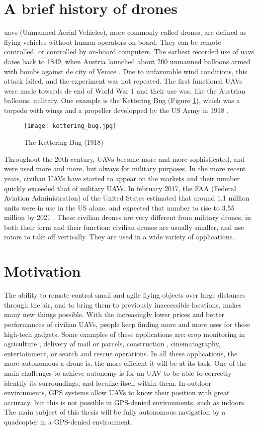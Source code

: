 \section{A brief history of drones}
\Glspl{uav} (Unmanned Aerial Vehicles), more commonly called drones, are defined as flying vehicles without human operators on board. They can be remote-controlled, or controlled by on-board computers. The earliest recorded use of \glspl{uav} dates back to 1849, when Austria launched about 200 unmanned balloons armed with bombs against de city of Venice \cite{anthology}. Due to unfavorable wind conditions, this attack failed, and the experiment was not repeated. The first functional UAVs were made towards de end of World War 1 and their use was, like the Austrian balloons, military. One example is the Kettering Bug (Figure \ref{fig:ketteringbug}), which was a torpedo with wings and a propeller developped by the US Army in 1918 \cite{dronesww1}.
\begin{figure}[H]
  \centering
  \texttt{[image: kettering\_bug.jpg]}
    \caption{The Kettering Bug (1918)}
    \label{fig:ketteringbug}
\end{figure}

Throughout the 20th century, UAVs become more and more sophisticated, and were used more and more, but always for military purposes. In the more recent years, civilian UAVs have started to appear on the markets and their number quickly exceeded that of military UAVs. In february 2017, the FAA (Federal Aviation Administration) of the United States estimated that around 1.1 million units were in use in the US alone, and expected that number to rise to 3.55 million by 2021 \cite{consumerdronesbythenumbers}. These civilian drones are very different from military drones, in both their form and their function: civilian drones are usually smaller, and use rotors to take off vertically. They are used in a wide variety of applications.

\section{Motivation}
The ability to remote-control small and agile flying objects over large distances through the air, and to bring them to previously inaccessible locations, makes many new things possible. With the increasingly lower prices and better performances of civilian UAVs, people keep finding more and more uses for these high-tech gadgets. Some examples of these applications are: crop monitoring in agriculture \cite{agriculturaldrones}, delivery of mail or parcels, construction \cite{batiravecdesdrones}, cinematography, entertainment, or search and rescue operations. In all these applications, the more autonomous a drone is, the more efficient it will be at its task. One of the main challenges to achieve autonomy is for an UAV to be able to correctly identify its surroundings, and localize itself within them. In outdoor environments, GPS systems allow UAVs to know their position with great accuracy, but this is not possible in GPS-denied environments, such as indoors. The main subject of this thesis will be fully autonomous navigation by a quadcopter in a GPS-denied environment.


